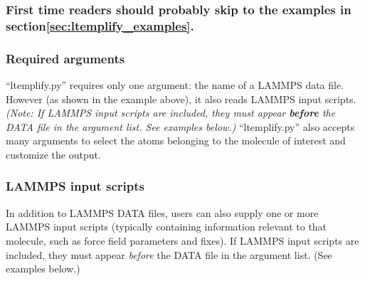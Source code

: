 \documentclass[11pt]{article}
\begin{document}
\subsubsection*{First time readers should probably skip to
the examples in section\ref{sec:ltemplify_examples}.}

\subsubsection*{Required arguments}

``ltemplify.py'' requires only one argument: the name of a LAMMPS data file.
However (as shown in the example above), it also reads LAMMPS input scripts.
\textit{(Note: If LAMMPS input scripts are included, they must appear
\textbf{before} the DATA file in the argument list.  See examples below.)}
``ltemplify.py'' also accepts many arguments to select the atoms belonging
to the molecule of interest and customize the output.

\subsubsection*{LAMMPS input scripts}

In addition to LAMMPS DATA files, users can also supply
one or more LAMMPS input scripts
(typically containing information relevant to that molecule,
such as force field parameters and fixes).
If LAMMPS input scripts are included, they must appear \textit{before}
the DATA file in the argument list. (See examples below.)

\pagebreak
\end{document}

